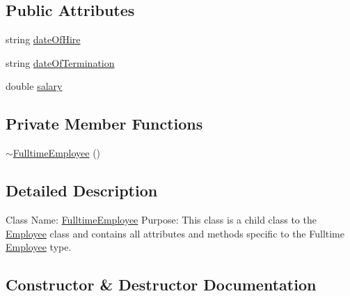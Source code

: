 \subsection*{Public Attributes}
\begin{DoxyCompactItemize}
\item 
string \hyperlink{class_all_employees_1_1_fulltime_employee_a017478702f4675eeb71fee1bdc3a155c}{date\+Of\+Hire}
\item 
string \hyperlink{class_all_employees_1_1_fulltime_employee_acf523a8b0c287762d3db8b2ab5604815}{date\+Of\+Termination}
\item 
double \hyperlink{class_all_employees_1_1_fulltime_employee_ad52581c3ee723884cc6b34111cac53b7}{salary}
\end{DoxyCompactItemize}
\subsection*{Private Member Functions}
\begin{DoxyCompactItemize}
\item 
\hyperlink{class_all_employees_1_1_fulltime_employee_ab1a76442dc82ad179631873ee4f6dea6}{$\sim$\+Fulltime\+Employee} ()
\end{DoxyCompactItemize}


\subsection{Detailed Description}
Class Name\+: \hyperlink{class_all_employees_1_1_fulltime_employee}{Fulltime\+Employee} Purpose\+: This class is a child class to the \hyperlink{class_all_employees_1_1_employee}{Employee} class and contains all attributes and methods specific to the Fulltime \hyperlink{class_all_employees_1_1_employee}{Employee} type. 

\subsection{Constructor \& Destructor Documentation}
\hypertarget{class_all_employees_1_1_fulltime_employee_a2f7744fed20aa3161c5ac5cd37c1a281}{}
